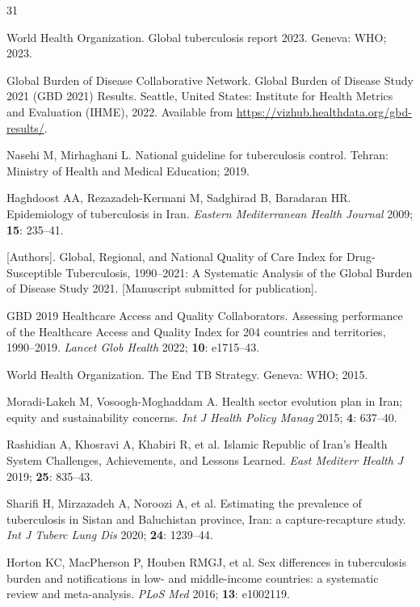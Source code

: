 \documentclass[12pt]{article}
\begin{document}
\begin{thebibliography}{31}

World Health Organization. Global tuberculosis report 2023. Geneva: WHO; 2023.

Global Burden of Disease Collaborative Network. Global Burden of Disease Study 2021 (GBD 2021) Results. Seattle, United States: Institute for Health Metrics and Evaluation (IHME), 2022. Available from \url{https://vizhub.healthdata.org/gbd-results/}.

Nasehi M, Mirhaghani L. National guideline for tuberculosis control. Tehran: Ministry of Health and Medical Education; 2019.

Haghdoost AA, Rezazadeh-Kermani M, Sadghirad B, Baradaran HR. Epidemiology of tuberculosis in Iran. \textit{Eastern Mediterranean Health Journal} 2009; \textbf{15}: 235--41.

[Authors]. Global, Regional, and National Quality of Care Index for Drug-Susceptible Tuberculosis, 1990--2021: A Systematic Analysis of the Global Burden of Disease Study 2021. [Manuscript submitted for publication].

GBD 2019 Healthcare Access and Quality Collaborators. Assessing performance of the Healthcare Access and Quality Index for 204 countries and territories, 1990--2019. \textit{Lancet Glob Health} 2022; \textbf{10}: e1715--43.

World Health Organization. The End TB Strategy. Geneva: WHO; 2015.

Moradi-Lakeh M, Vosoogh-Moghaddam A. Health sector evolution plan in Iran; equity and sustainability concerns. \textit{Int J Health Policy Manag} 2015; \textbf{4}: 637--40.

Rashidian A, Khosravi A, Khabiri R, et al. Islamic Republic of Iran's Health System Challenges, Achievements, and Lessons Learned. \textit{East Mediterr Health J} 2019; \textbf{25}: 835--43.

Sharifi H, Mirzazadeh A, Noroozi A, et al. Estimating the prevalence of tuberculosis in Sistan and Baluchistan province, Iran: a capture-recapture study. \textit{Int J Tuberc Lung Dis} 2020; \textbf{24}: 1239--44.

Horton KC, MacPherson P, Houben RMGJ, et al. Sex differences in tuberculosis burden and notifications in low- and middle-income countries: a systematic review and meta-analysis. \textit{PLoS Med} 2016; \textbf{13}: e1002119.


\end{thebibliography}
\end{document}
